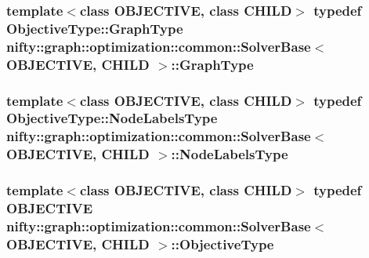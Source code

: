 \subsubsection[{Graph\+Type}]{\setlength{\rightskip}{0pt plus 5cm}template$<$class O\+B\+J\+E\+C\+T\+I\+V\+E, class C\+H\+I\+L\+D$>$ typedef Objective\+Type\+::\+Graph\+Type {\bf nifty\+::graph\+::optimization\+::common\+::\+Solver\+Base}$<$ O\+B\+J\+E\+C\+T\+I\+V\+E, C\+H\+I\+L\+D $>$\+::{\bf Graph\+Type}}\label{classnifty_1_1graph_1_1optimization_1_1common_1_1SolverBase_a5b93d8c567c27949a944e908f59f8933}
\hypertarget{classnifty_1_1graph_1_1optimization_1_1common_1_1SolverBase_a6e4e465f3b6e039882669fcfb9714818}{}
\subsubsection[{Node\+Labels\+Type}]{\setlength{\rightskip}{0pt plus 5cm}template$<$class O\+B\+J\+E\+C\+T\+I\+V\+E, class C\+H\+I\+L\+D$>$ typedef Objective\+Type\+::\+Node\+Labels\+Type {\bf nifty\+::graph\+::optimization\+::common\+::\+Solver\+Base}$<$ O\+B\+J\+E\+C\+T\+I\+V\+E, C\+H\+I\+L\+D $>$\+::{\bf Node\+Labels\+Type}}\label{classnifty_1_1graph_1_1optimization_1_1common_1_1SolverBase_a6e4e465f3b6e039882669fcfb9714818}
\hypertarget{classnifty_1_1graph_1_1optimization_1_1common_1_1SolverBase_a28e77903302d3c14fa9fddb5d0a6214d}{}
\subsubsection[{Objective\+Type}]{\setlength{\rightskip}{0pt plus 5cm}template$<$class O\+B\+J\+E\+C\+T\+I\+V\+E, class C\+H\+I\+L\+D$>$ typedef O\+B\+J\+E\+C\+T\+I\+V\+E {\bf nifty\+::graph\+::optimization\+::common\+::\+Solver\+Base}$<$ O\+B\+J\+E\+C\+T\+I\+V\+E, C\+H\+I\+L\+D $>$\+::{\bf Objective\+Type}}\label{classnifty_1_1graph_1_1optimization_1_1common_1_1SolverBase_a28e77903302d3c14fa9fddb5d0a6214d}
\hypertarget{classnifty_1_1graph_1_1optimization_1_1common_1_1SolverBase_ae445fe93efdb410186debfa5a248dfad}{}
